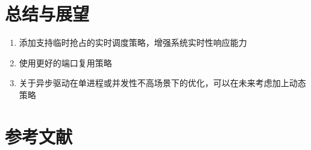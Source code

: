 \documentclass{article}
\begin{document}



\newpage
\section{总结与展望}

\begin{enumerate}
    \item 添加支持临时抢占的实时调度策略，增强系统实时性响应能力
    \item 使用更好的端口复用策略
    \item 关于异步驱动在单进程或并发性不高场景下的优化，可以在未来考虑加上动态策略
\end{enumerate}

\newpage
\section{参考文献}
\end{document}
